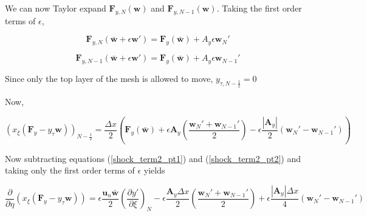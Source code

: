 \documentclass[10pt]{article}
\begin{document}
	We can now Taylor expand $\mathbf{F}_{y,N}(\mathbf{w})$ and $\mathbf{F}_{y,N-1}(\mathbf{w})$. Taking the first order terms of $\epsilon$,
	
	$$ \mathbf{F}_{y,N}(\bar{\mathbf{w}} + \epsilon \mathbf{w}') = \mathbf{F}_{y}(\bar{\mathbf{w}}) + A_y \epsilon \mathbf{w}_N' $$
	
	$$ \mathbf{F}_{y,N-1}(\bar{\mathbf{w}} + \epsilon \mathbf{w}') = \mathbf{F}_{y}(\bar{\mathbf{w}}) + A_y \epsilon \mathbf{w}_{N-1}' $$
	
	Since only the top layer of the mesh is allowed to move, $y_{\tau,N-\frac{1}{2}}=0$
	
	Now,
	
	\begin{equation} \label{shock_term2_pt2}
		(x_\xi (\mathbf{F}_y - y_\tau \mathbf{w}))_{N-\frac{1}{2}} = \frac{\Delta x}{2} \left( \mathbf{F}_{y}(\bar{\mathbf{w}}) + \epsilon \mathbf{A}_y \left( \frac{\mathbf{w}_N' + \mathbf{w}_{N-1}'}{2}\right) - \epsilon \frac{|\mathbf{A}_y|}{2} ( \mathbf{w}_N' - \mathbf{w}_{N-1}') \right)
	\end{equation}
	
	Now subtracting  equations (\ref{shock_term2_pt1}) and (\ref{shock_term2_pt2}) and taking only the first order terms of $\epsilon$ yields
	
	\begin{equation}
		\frac{\partial}{\partial \eta} (x_\xi (\mathbf{F}_y - y_\tau \mathbf{w})) = \epsilon \frac{\mathbf{u}_u \bar{\mathbf{w}}}{2} \left( \frac{\partial y'}{\partial \xi} \right)_N - \epsilon \frac{\mathbf{A}_y \Delta x}{2} \left( \frac{\mathbf{w}_N' + \mathbf{w}_{N-1}'}{2} \right) + \epsilon \frac{|\mathbf{A}_y| \Delta x}{4} ( \mathbf{w}_N' - \mathbf{w}_{N-1}')
	\end{equation}
	
	
	
	
\end{document}
